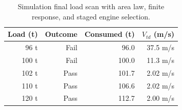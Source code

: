 \begin{table}[htbp]
\caption{Simulation final load scan with area law, finite response, and staged engine selection.}
\label{tab:src19}
\small
\setlength{\tabcolsep}{3.5pt}
\begin{tabularx}{\linewidth}{@{}rrrr@{}}
\toprule
Load (t) & Outcome & Consumed (t) & $V_{td}$ (m/s) \\
\midrule
96 t & Fail & 96.0 & 37.5 m/s \\
100 t & Fail & 100.0 & 11.3 m/s \\
102 t & Pass & 101.7 & 2.02 m/s \\
110 t & Pass & 106.6 & 2.02 m/s \\
120 t & Pass & 112.7 & 2.00 m/s \\
\bottomrule
\end{tabularx}
\par{}
\end{table}
